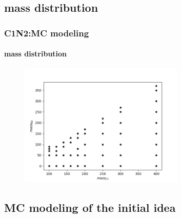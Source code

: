 \documentclass[usenames,dvipsnames]{beamer}
\begin{document}
\subsection{mass distribution}
\begin{frame}
	\frametitle{C1N2:MC modeling}
	\framesubtitle{mass distribution}
	\begin{figure}
		\centering
		\includegraphics[width = 0.7\textwidth]{graphics/mass.png}
	\end{figure}
\end{frame}

\subsection{MC modeling of the initial idea}
\end{document}
